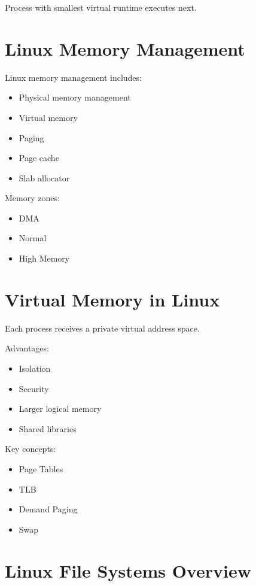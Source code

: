 Process with smallest virtual runtime executes next.

\section{Linux Memory Management}

Linux memory management includes:

\begin{itemize}
\item Physical memory management
\item Virtual memory
\item Paging
\item Page cache
\item Slab allocator
\end{itemize}

Memory zones:

\begin{itemize}
\item DMA
\item Normal
\item High Memory
\end{itemize}

\section{Virtual Memory in Linux}

Each process receives a private virtual address space.

Advantages:

\begin{itemize}
\item Isolation
\item Security
\item Larger logical memory
\item Shared libraries
\end{itemize}

Key concepts:

\begin{itemize}
\item Page Tables
\item TLB
\item Demand Paging
\item Swap
\end{itemize}

\section{Linux File Systems Overview}

